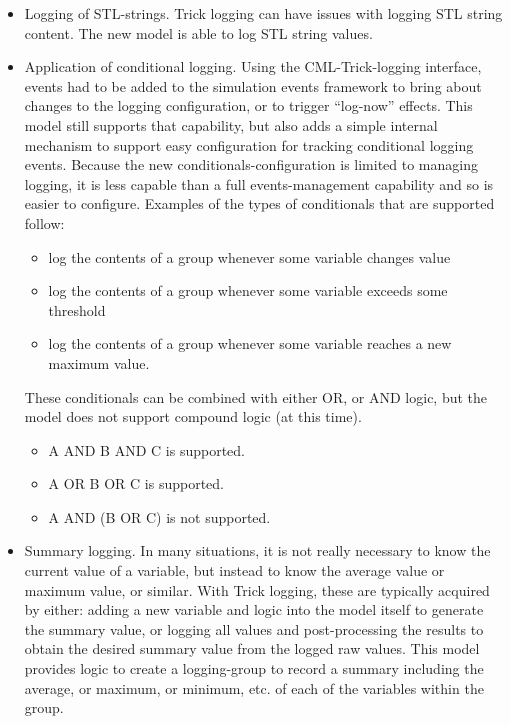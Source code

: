 \documentclass[11pt,fleqn]{report}
\begin{document}
\begin{itemize}
  \item Logging of STL-strings. Trick logging can have issues with
        logging STL string content. The new model is able to log STL
        string values.
  \item Application of conditional logging.
        Using the CML-Trick-logging interface, events had to be added
        to the simulation events framework to bring about changes to
        the logging configuration, or to trigger “log-now” effects.
        This model still supports that capability, but also adds a
        simple internal mechanism to support easy configuration for
        tracking conditional logging events. Because the new
        conditionals-configuration is limited to managing logging,
        it is less capable than a full events-management capability
        and so is easier to configure. Examples of the types of
        conditionals that are supported follow:
  \begin{itemize}
    \item log the contents of a group whenever some variable changes value
    \item log the contents of a group whenever some variable exceeds some
          threshold
    \item log the contents of a group whenever some variable reaches a new
          maximum value.
  \end{itemize}
        These conditionals can be combined with either OR, or AND logic,
        but the model does not support compound logic (at this time).
  \begin{itemize}
    \item A AND B AND C is supported.
    \item A OR B OR C is supported.
    \item A AND (B OR C) is not supported.
  \end{itemize}
  \item Summary logging. In many situations, it is not really necessary
        to know the current value of a variable, but instead to know the average
        value or maximum value, or similar. With Trick logging, these are
        typically acquired by either: adding a new variable and logic into
        the model itself to generate the summary value, or logging all values
        and post-processing the results to obtain the desired summary value
        from the logged raw values. This model provides logic to create a
        logging-group to record a summary including the average, or maximum,
        or minimum, etc. of each of the variables within the group.

\end{itemize}
\end{document}
